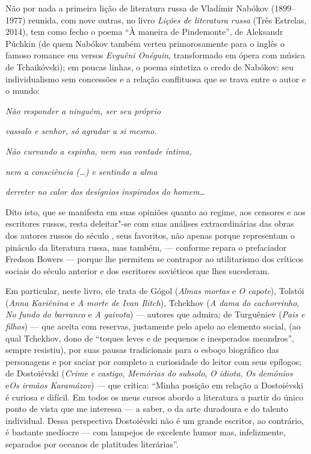 Não por nada a primeira lição de literatura russa de Vladímir Nabókov
(1899--1977) reunida, com nove outras, no livro \emph{Lições de
literatura russa} (Três Estrelas, 2014), tem como fecho o poema
``À maneira de Pindemonte'', de Aleksandr Púchkin (de quem Nabókov
também verteu primorosamente para o inglês o famoso romance em versos
\emph{Evguêni Onéguin}, transformado em ópera com música de
Tchaikóvski); em poucas linhas, o poema sintetiza o credo de Nabókov:
seu individualismo sem concessões e a relação conflituosa que se trava
entre o autor e o mundo:

\emph{Não responder a ninguém, ser seu próprio}

\emph{vassalo e senhor, só agradar a si mesmo.}

\emph{Não curvando a espinha, nem sua vontade íntima,}

\emph{nem a consciência (\ldots{}) e sentindo a alma}

\emph{derreter no calor dos desígnios inspirados do homem\ldots{}}

Dito isto, que se manifesta em suas opiniões quanto ao regime, aos
censores e aos escritores russos, resta deleitar"-se com suas análises
extraordinárias das obras dos autores russos do século , seus
favoritos, não apenas porque representam o pináculo da literatura russa,
mas também, --- conforme repara o prefaciador Fredson Bowers --- porque
lhe permitem se contrapor ao utilitarismo dos críticos sociais do século
anterior e dos escritores soviéticos que lhes sucederam.

Em particular, neste livro, ele trata de Gógol (\emph{Almas mortas} e
\emph{O capote}), Tolstói (\emph{Anna Kariênina} e \emph{A morte de Ivan
Ilitch}), Tchekhov (\emph{A dama do cachorrinho}, \emph{No fundo do
barranco} e \emph{A gaivota}) --- autores que admira; de Turguêniev
(\emph{Pais e filhos}) --- que aceita com reservas, justamente pelo apelo
ao elemento social, (ao qual Tchekhov, dono de ``toques leves e de
pequenos e inesperados meandros'', sempre resistiu), por suas pausas
tradicionais para o esboço biográfico das personagens e por saciar por
completo a curiosidade do leitor com seus epílogos; de Dostoiévski
(\emph{Crime e castigo}, \emph{Memórias do subsolo}, \emph{O idiota},
\emph{Os demônios} e\emph{Os irmãos Karamázov}) --- que critica: ``Minha
posição em relação a Dostoiévski é curiosa e difícil. Em todos os meus
cursos abordo a literatura a partir do único ponto de vista que me
interessa --- a saber, o da arte duradoura e do talento individual. Dessa
perspectiva Dostoiévski não é um grande escritor, ao contrário, é
bastante medíocre --- com lampejos de excelente humor mas, infelizmente,
separados por oceanos de platitudes literárias''.

